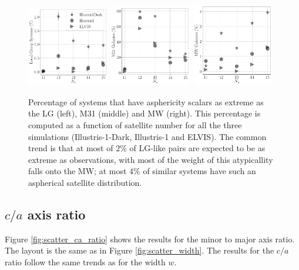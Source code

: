 \documentclass[a4paper,fleqn,usenatbib]{mnras}
\begin{document}
\begin{figure}
\centering
\includegraphics[width=0.32\textwidth]{LG_numbers.pdf}
\includegraphics[width=0.32\textwidth]{M31_numbers.pdf}
\includegraphics[width=0.32\textwidth]{MW_numbers.pdf}
\caption{
Percentage of systems that have asphericity scalars as extreme as the
LG (left), M31 (middle) and MW (right).  
This percentage is computed as a function of satellite number for all
the three simulations (Illustris-1-Dark, Illustris-1 and ELVIS).
The common trend is that at most of $2\%$ of LG-like pairs are expected to
be as extreme as observations, with most of the weight of this
atypicallity falls onto the MW; at most $4\%$ of similar systems have
such an aspherical satellite distribution. 
\label{fig:expected_number}}
\end{figure}

\subsection{$c/a$ axis ratio}

Figure \ref{fig:scatter_ca_ratio} shows the results for the minor to
major axis ratio. 
The layout is the same as in Figure \ref{fig:scatter_width}.
The results for the $c/a$ ratio follow the same trends as for the
width $w$.
\end{document}
